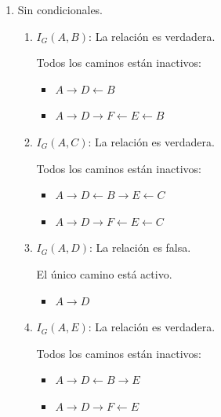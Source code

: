 \documentclass[12pt,a4paper]{article}
\begin{document}
\begin{enumerate}
    \item Sin condicionales.
    \begin{enumerate}
        \item $I_G(A, B)$: \; La relación es verdadera.
        
        Todos los caminos están inactivos:
        \begin{multicols}{2}
            \begin{itemize}
                \item $A \to D \leftarrow B$
                \item $A \to D \to F \leftarrow E \leftarrow B$
            \end{itemize}
        \end{multicols}

        \item $I_G(A, C)$: \; La relación es verdadera.
        
        Todos los caminos están inactivos:
        \begin{multicols}{2}
            \begin{itemize}
                \item $A \to D \leftarrow B \to E \leftarrow C$
                \item $A \to D \to F \leftarrow E \leftarrow C$
            \end{itemize}
        \end{multicols}

        \item $I_G(A, D)$: \; La relación es falsa.
        
        El único camino está activo.
        \begin{multicols}{2}
            \begin{itemize}
                \item $A \to D$
            \end{itemize}
        \end{multicols}

        \item $I_G(A, E)$: \; La relación es verdadera.
        
        Todos los caminos están inactivos:
        \begin{multicols}{2}
            \begin{itemize}
                \item $A \to D \leftarrow B \to E$
                \item $A \to D \to F \leftarrow E$
            \end{itemize}
        \end{multicols}


\end{enumerate}
\end{enumerate}
\end{document}
